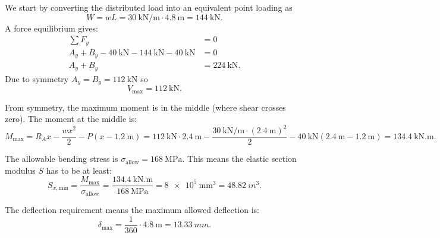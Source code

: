 \begin{derivation}
  We start by converting the distributed load into an equivalent point loading as
  \begin{equation*}
    W = wL =  \qty{30}{\kN\per\m} \cdot \qty{4.8}{\m}  = \qty{144}{\kN}
  .\end{equation*}
  A force equilibrium gives:
  \begin{align*}
    \sum F_y &= 0 \\
    A_y + B_y - \qty{40}{\kN} - \qty{144}{\kN} - \qty{40}{\kN} &= 0 \\
    A_y + B_y &= \qty{224}{\kN} 
  .\end{align*}
  Due to symmetry $A_y = B_y = \qty{112}{\kN}$ so
  \begin{equation*}
    V_{\mathrm{max}} = \qty{112}{\kN}
  .\end{equation*}
  
  From symmetry, the maximum moment is in the middle (where shear crosses zero).
  The moment at the middle is:
  \begin{equation*}
    M_{\mathrm{max}} = R_A x - \frac{wx^2}{2}  - P \left( x - \qty{1,2}{\m}  \right) = \qty{112}{\kN} \cdot \qty{2.4}{\m} - \frac{\qty{30}{\kN\per\m} \cdot \left( \qty{2.4}{\m}  \right)^2}{2} - \qty{40}{\kN} \left( \qty{2.4}{\m} - \qty{1.2}{\m}  \right) = \qty{134,4}{\kN.\m}
  .\end{equation*}
  
  The allowable bending stress is $\sigma_{\mathrm{allow}} = \qty{168}{\MPa}$. 
  This means the elastic section modulus $S$ has to be at least:
  \begin{equation*}
    S_{x, \mathrm{min}} = \frac{M_{\mathrm{max}}}{\sigma_{\mathrm{allow}}} = \frac{\qty{134.4}{\kN.\m}}{\qty{168}{\MPa}} = \qty{8e5}{\mm^3} = \qty{48.82}{in^3}  
  .\end{equation*}
  
  The deflection requirement means the maximum allowed deflection is:
  \begin{equation*}
    \delta_{\mathrm{max}} = \frac{1}{360} \cdot \qty{4.8}{\m}  = \qty{13.33}{mm}
  .\end{equation*}
  

\end{derivation}
